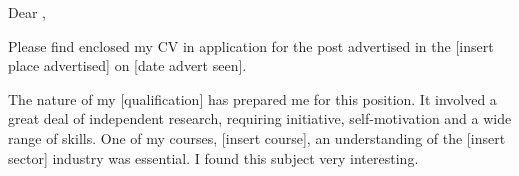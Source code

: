 \documentclass[a4paper]{ReadableCV}
\begin{document}
	





\setYourWebAddr{}





\newHeading{}


 
\showHeader




\makeLetter

Dear \recpname,

\bigskip

Please find enclosed my CV in application for the post advertised in the [insert place advertised] on [date advert seen].

The nature of my [qualification] has prepared me for this position. It involved a great deal of independent research, requiring initiative, self-motivation and a wide range of skills. One of my courses, [insert course], an understanding of the [insert sector] industry was essential. I found this subject very interesting.
\end{document}
